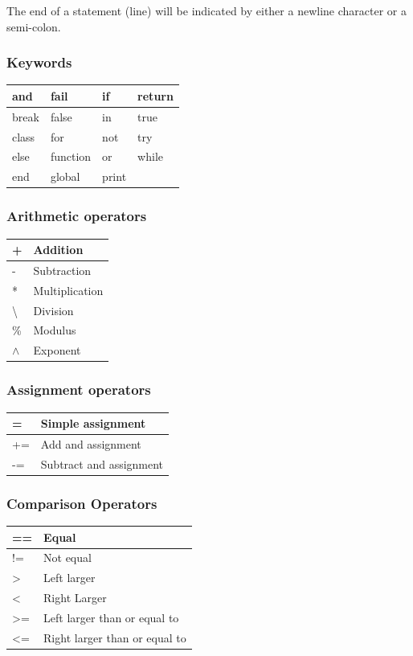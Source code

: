 \documentclass[a4paper,12pt]{article}
\begin{document}
The end of a statement (line) will be indicated by either a newline character or a semi-colon.

\begin{multicols}{2}

  \subsubsection*{Keywords}
  \begin{tabular}{| l | l | l | l | } \hline
    and & fail & if & return \\ \hline
    break & false & in & true \\ \hline
    class & for & not & try \\ \hline
    else & function & or & while \\ \hline
    end & global &  print &  \\ \hline
  \end{tabular}

  \subsubsection*{Arithmetic operators}
  \begin{tabular}{| l | l | } \hline
    + & Addition \\ \hline
    - & Subtraction \\ \hline
    * & Multiplication \\ \hline
    \textbackslash & Division \\ \hline
    \% & Modulus \\ \hline
    \(\wedge\)  & Exponent \\ \hline
  \end{tabular}

  \subsubsection*{Assignment operators}
  \begin{tabular}{| l | l | } \hline
    = & Simple assignment  \\ \hline
    += & Add and assignment  \\ \hline
    -= & Subtract and assignment  \\ \hline
  \end{tabular}

  \subsubsection*{Comparison Operators}
  \begin{tabular}{| l | l | } \hline
    == & Equal \\ \hline
    != & Not equal \\ \hline
    \textgreater & Left larger \\ \hline
    \textless & Right Larger \\ \hline
    \textgreater= & Left larger than or equal to \\ \hline
    \textless= & Right larger than or equal to \\ \hline
  \end{tabular}

\end{multicols}
\end{document}
